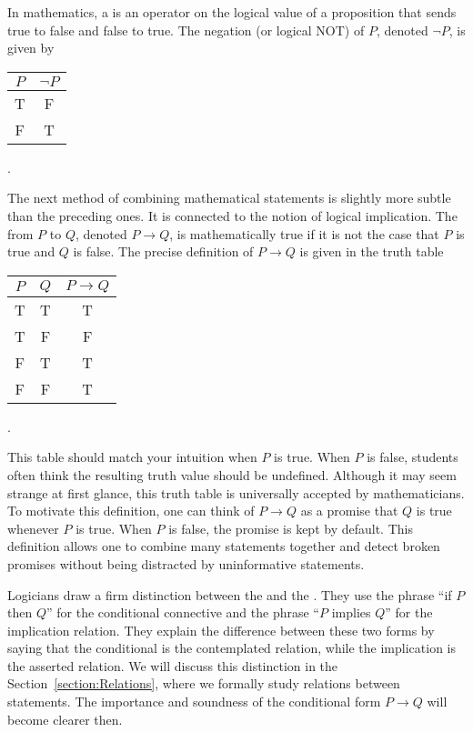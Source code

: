 In mathematics, a  is an operator on the logical value of a proposition that sends true to false and false to true.
The negation (or logical NOT) of $P$, denoted $\neg P$, is given by
\begin{center}
\begin{tabular}{|c|c|}
\hline
$P$ & $\neg P$ \\
\hline
T & F \\
F & T \\
\hline
\end{tabular} .
\end{center}

The next method of combining mathematical statements is slightly more subtle than the preceding ones.
It is connected to the notion of logical implication.
The  from $P$ to $Q$, denoted $P \rightarrow Q$, is mathematically true if it is not the case that $P$ is true and $Q$ is false.
The precise definition of $P \rightarrow Q$ is given in the truth table
\begin{center}
\begin{tabular}{|c|c|c|}
\hline
$P$ & $Q$ & $P \rightarrow Q$ \\
\hline
T & T & T \\
T & F & F \\
F & T & T \\
F & F & T \\
\hline
\end{tabular} .
\end{center}
This table should match your intuition when $P$ is true.
When $P$ is false, students often think the resulting truth value should be undefined.
Although it may seem strange at first glance, this truth table is universally accepted by mathematicians.
To motivate this definition, one can think of $P \rightarrow Q$ as a promise that $Q$ is true whenever $P$ is true.
When $P$ is false, the promise is kept by default.
This definition allows one to combine many statements together and detect broken promises without being distracted by uninformative statements.

Logicians draw a firm distinction between the  and the .
They use the phrase ``if $P$ then $Q$'' for the conditional connective and the phrase ``$P$ implies $Q$'' for the implication relation.
They explain the difference between these two forms by saying that the conditional is the contemplated relation, while the implication is the asserted relation.
We will discuss this distinction in the Section~\ref{section:Relations}, where we formally study relations between statements.
The importance and soundness of the conditional form $P \rightarrow Q$ will become clearer then.

